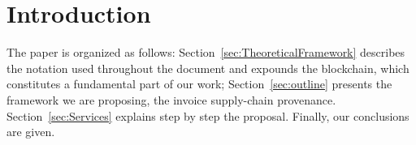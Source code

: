 \section{Introduction}

The paper is organized as follows: 
Section~\ref{sec:TheoreticalFramework} describes the notation used 
throughout the document and expounds the blockchain, which constitutes 
a fundamental part of our work; 
Section~\ref{sec:outline} presents the framework we are proposing, 
the invoice supply-chain provenance. 
Section~\ref{sec:Services} explains step by step the proposal.
Finally, our conclusions are given.